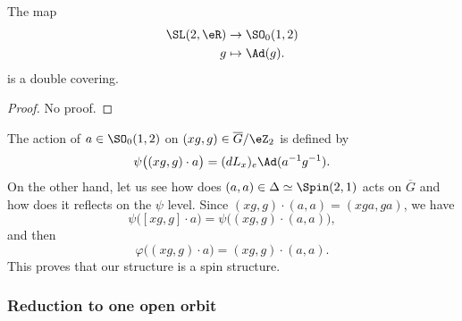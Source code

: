 \begin{lemma}
The map
\begin{equation}
\begin{aligned}
 \SL(2,\eR)&\to \SO_{0}(1,2)\\
   g&\mapsto\Ad(g).
\end{aligned}
\end{equation}
is a double covering.
\end{lemma}
\begin{proof}
No proof.
\end{proof}
The action of $a\in\SO_{0}(1,2)$ on $(xg,g)\in\overline{G}/\eZ_{2}$ is defined by
\begin{equation}
\psi\big( (xg,g)\cdot a \big)=(dL_{x})_{e}\Ad(a^{-1}g^{-1}).
\end{equation}
On the other hand, let us see how does $(a,a)\in\Delta\simeq \Spin(2,1)$ acts on $\overline{G}$ and how does it reflects on the $\psi$ level. Since $(xg,g)\cdot (a,a)=(xga,ga)$, we have
\[
  \psi\big( [xg,g]\cdot a \big)=\psi\big( (xg,g)\cdot(a,a) \big),
\]
and then
\[
  \varphi\big( (xg,g)\cdot a \big)=(xg,g)\cdot(a,a).
\]
This proves that our structure is a spin structure.

\subsubsection{Reduction to one open orbit}

